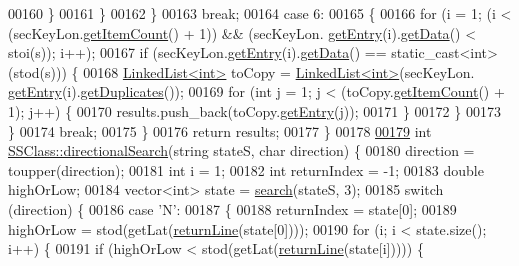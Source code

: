 \begin{DoxyCode}
00160             \}
00161         \}
00162     \}
00163     \textcolor{keywordflow}{break};
00164     \textcolor{keywordflow}{case} 6:
00165     \{
00166         \textcolor{keywordflow}{for} (i = 1; (i < (secKeyLon.\hyperlink{classLinkedList_afc6635f854f48f2f126cf3b60d845220}{getItemCount}() + 1)) && (secKeyLon.
      \hyperlink{classLinkedList_a341bfd7772c9d24d29eb7a7f3936915b}{getEntry}(i).\hyperlink{classSecKeySS_a9fdb8a771250b7aaab556f019b381eab}{getData}() < stoi(s)); i++);
00167         \textcolor{keywordflow}{if} (secKeyLon.\hyperlink{classLinkedList_a341bfd7772c9d24d29eb7a7f3936915b}{getEntry}(i).\hyperlink{classSecKeySS_a9fdb8a771250b7aaab556f019b381eab}{getData}() == \textcolor{keyword}{static\_cast<}\textcolor{keywordtype}{int}\textcolor{keyword}{>}(stod(s))) \{
00168             \hyperlink{classLinkedList}{LinkedList<int>} toCopy = \hyperlink{classLinkedList}{LinkedList<int>}(secKeyLon.
      \hyperlink{classLinkedList_a341bfd7772c9d24d29eb7a7f3936915b}{getEntry}(i).\hyperlink{classSecKeySS_abef7c9c03e9bc6b818d599966428fdec}{getDuplicates}());
00169             \textcolor{keywordflow}{for} (\textcolor{keywordtype}{int} j = 1; j < (toCopy.\hyperlink{classLinkedList_afc6635f854f48f2f126cf3b60d845220}{getItemCount}() + 1); j++) \{
00170                 results.push\_back(toCopy.\hyperlink{classLinkedList_a341bfd7772c9d24d29eb7a7f3936915b}{getEntry}(j));
00171             \}
00172         \}
00173     \}
00174     \textcolor{keywordflow}{break};
00175     \}
00176     \textcolor{keywordflow}{return} results;
00177 \}
00178 
\hyperlink{classSSClass_ad03c99840c2946a2112f5f1942c287f2}{00179} \textcolor{keywordtype}{int} \hyperlink{classSSClass_ad03c99840c2946a2112f5f1942c287f2}{SSClass::directionalSearch}(\textcolor{keywordtype}{string} stateS, \textcolor{keywordtype}{char} direction) \{
00180     direction = toupper(direction);
00181     \textcolor{keywordtype}{int} i = 1;
00182     \textcolor{keywordtype}{int} returnIndex = -1;
00183     \textcolor{keywordtype}{double} highOrLow;
00184     vector<int> state = \hyperlink{classSSClass_a9df3598c000a6a5e9ef994d19196e69f}{search}(stateS, 3);
00185     \textcolor{keywordflow}{switch} (direction) \{
00186     \textcolor{keywordflow}{case} \textcolor{charliteral}{'N'}:
00187     \{
00188         returnIndex = state[0];
00189         highOrLow = stod(getLat(\hyperlink{classSSClass_ab0a8ea1af895df28359b5733bd920ef3}{returnLine}(state[0])));
00190         \textcolor{keywordflow}{for} (i; i < state.size(); i++) \{
00191             \textcolor{keywordflow}{if} (highOrLow < stod(getLat(\hyperlink{classSSClass_ab0a8ea1af895df28359b5733bd920ef3}{returnLine}(state[i])))) \{

\end{DoxyCode}
